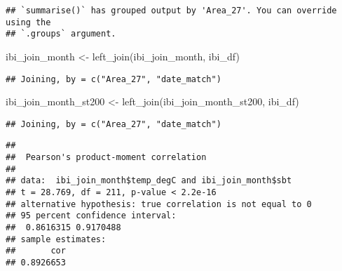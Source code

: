 \documentclass[
]{article}
\newenvironment{Shaded}{\begin{snugshade}}{\end{snugshade}}
\newcommand{\CommentTok}[1]{\textcolor[rgb]{0.56,0.35,0.01}{\textit{#1}}}
\newcommand{\FunctionTok}[1]{\textcolor[rgb]{0.00,0.00,0.00}{#1}}
\newcommand{\NormalTok}[1]{#1}
\newcommand{\OtherTok}[1]{\textcolor[rgb]{0.56,0.35,0.01}{#1}}
\newcommand{\SpecialCharTok}[1]{\textcolor[rgb]{0.00,0.00,0.00}{#1}}
\newcommand{\StringTok}[1]{\textcolor[rgb]{0.31,0.60,0.02}{#1}}
\begin{document}
\begin{verbatim}
## `summarise()` has grouped output by 'Area_27'. You can override using the
## `.groups` argument.
\end{verbatim}

\begin{Shaded}
\begin{Highlighting}[]
\NormalTok{ibi\_join\_month }\OtherTok{\textless{}{-}} \FunctionTok{left\_join}\NormalTok{(ibi\_join\_month, ibi\_df)}
\end{Highlighting}
\end{Shaded}

\begin{verbatim}
## Joining, by = c("Area_27", "date_match")
\end{verbatim}

\begin{Shaded}
\begin{Highlighting}[]
\NormalTok{ibi\_join\_month\_st200 }\OtherTok{\textless{}{-}} \FunctionTok{left\_join}\NormalTok{(ibi\_join\_month\_st200, ibi\_df)}
\end{Highlighting}
\end{Shaded}

\begin{verbatim}
## Joining, by = c("Area_27", "date_match")
\end{verbatim}

\begin{Shaded}
\end{Shaded}

\begin{verbatim}
## 
##  Pearson's product-moment correlation
## 
## data:  ibi_join_month$temp_degC and ibi_join_month$sbt
## t = 28.769, df = 211, p-value < 2.2e-16
## alternative hypothesis: true correlation is not equal to 0
## 95 percent confidence interval:
##  0.8616315 0.9170488
## sample estimates:
##       cor 
## 0.8926653
\end{verbatim}

\begin{Shaded}
\end{Shaded}
\end{document}
